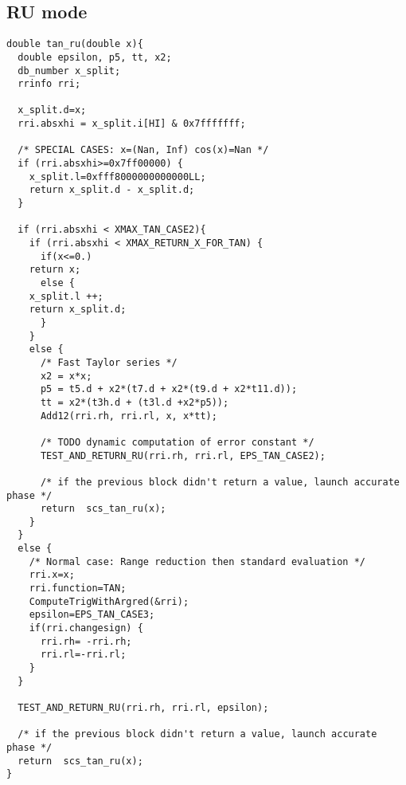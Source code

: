 \subsection{RU mode}
\begin{lstlisting}[caption={Exceptional cases for tangent RU},firstnumber=1]
double tan_ru(double x){
  double epsilon, p5, tt, x2;
  db_number x_split;
  rrinfo rri;

  x_split.d=x;
  rri.absxhi = x_split.i[HI] & 0x7fffffff;

  /* SPECIAL CASES: x=(Nan, Inf) cos(x)=Nan */
  if (rri.absxhi>=0x7ff00000) {
    x_split.l=0xfff8000000000000LL;
    return x_split.d - x_split.d;
  }

  if (rri.absxhi < XMAX_TAN_CASE2){
    if (rri.absxhi < XMAX_RETURN_X_FOR_TAN) {
      if(x<=0.)
	return x;
      else {
	x_split.l ++;
	return x_split.d;
      }
    }
    else {
      /* Fast Taylor series */
      x2 = x*x;
      p5 = t5.d + x2*(t7.d + x2*(t9.d + x2*t11.d));
      tt = x2*(t3h.d + (t3l.d +x2*p5));
      Add12(rri.rh, rri.rl, x, x*tt);

      /* TODO dynamic computation of error constant */
      TEST_AND_RETURN_RU(rri.rh, rri.rl, EPS_TAN_CASE2);

      /* if the previous block didn't return a value, launch accurate phase */
      return  scs_tan_ru(x);
    }
  }
  else {
    /* Normal case: Range reduction then standard evaluation */
    rri.x=x;
    rri.function=TAN;
    ComputeTrigWithArgred(&rri);
    epsilon=EPS_TAN_CASE3;
    if(rri.changesign) {
      rri.rh= -rri.rh;
      rri.rl=-rri.rl;
    }
  }

  TEST_AND_RETURN_RU(rri.rh, rri.rl, epsilon);

  /* if the previous block didn't return a value, launch accurate phase */
  return  scs_tan_ru(x);
}
\end{lstlisting}

